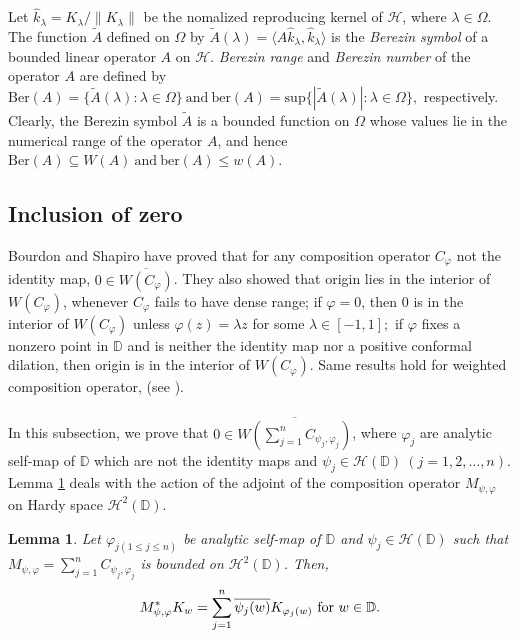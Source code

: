 \documentclass[12pt, reqno]{amsart}
\newtheorem{lemma}[theorem]{Lemma}
\theoremstyle{definition}
\theoremstyle{remark}
\numberwithin{equation}{section}
\begin{document}
Let $\widehat{k}_\lambda=K_\lambda/\|K_\lambda\|$ be the nomalized reproducing kernel of $\mathcal{H}$, where  $\lambda \in \Omega$. The function $\widetilde{A}$ defined on $\Omega$ by $\widetilde{A}(\lambda)=\langle A\widehat{k}_\lambda, \widehat{k}_\lambda\rangle$ is the {\it Berezin symbol} of a bounded linear operator $A$ on $\mathcal{H}$.
{\it Berezin range} and  {\it Berezin number} of the operator $A$ are defined by
$ \mbox{Ber}(A)=\{\widetilde{A}(\lambda):\lambda\in \Omega\}~ \mbox{and} ~\mbox{ber}(A)=\mbox{sup}\{|\widetilde{A}(\lambda)|:\lambda\in \Omega\},$  respectively.
Clearly, the  Berezin symbol $\widetilde{A}$ is a bounded function on $\Omega$ whose values lie in the numerical range of the operator $A$, and hence $ \mbox{Ber}(A)\subseteq W(A) ~\mbox{and}~ \mbox{ber}(A)\leq w(A).$ 





\subsection{Inclusion of zero}
Bourdon and Shapiro \cite{Bourdon_Shapiro_IEOT_2002} have proved that for any composition operator $C_\varphi$ not the identity map, $0\in \overline{W(C_\varphi)}$. They also showed that origin lies in the interior of $W(C_\varphi)$, whenever $C_\varphi$ fails to have dense range; if $\varphi=0$, then $0$ is in the interior of $W(C_\varphi)$ unless $\varphi(z)=\lambda z$ for some $\lambda\in [-1, 1];$ if $\varphi$ fixes a nonzero point in $\mathbb{D}$ and is neither the identity map nor a positive conformal dilation, then origin is in the interior of $W(C_\varphi)$. Same results hold for weighted composition operator, (see \cite{Gunatillake_Jovovic_Smith_JMAA_2014}). \\ \\
In this subsection, we prove that  $0\in \overline{W\left(\displaystyle \sum_{j=1}^{n}C_{\psi_j,\varphi_j}\right)}$, where $\varphi_j$ are analytic self-map of $\mathbb{D}$ which are not the identity maps and $\psi_j\in \mathcal{H}(\mathbb{D})~(j=1, 2,\dots, n)$. Lemma \ref{Lem_4.1} deals with the action of the adjoint of the composition operator $M_{\psi, \varphi}$ on Hardy space $\mathcal{H}^2(\mathbb{D})$.
\begin{lemma}\label{Lem_4.1}
	Let $\varphi_{j{(1\leq j\leq n)}}$ be analytic self-map of $\mathbb{D}$ and $\psi_j\in \mathcal{H}(\mathbb{D})$ such that $M_{\psi, \varphi}=\displaystyle\sum_{j=1}^{n}C_{\psi_j, \varphi_j} $ is bounded on $\mathcal{H}^2(\mathbb{D})$.	
	Then, $$ M_{\psi, \varphi}^*K_w=\sum_{j=1}^{n}\overline{\psi_j(w)}K_{\varphi_j(w)}~\textnormal{for}~w\in \mathbb{D}.$$
\end{lemma}
\end{document}
